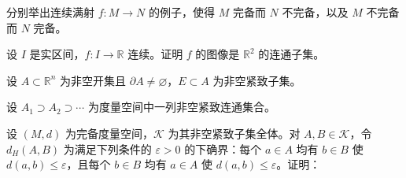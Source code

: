 \noindent\begin{minipage}{\textwidth}
分别举出连续满射 $f:M\to N$ 的例子，使得 $M$ 完备而 $N$ 不完备，以及 $M$ 不完备而 $N$ 完备。
\end{minipage}\par\vfill
\newpage
\noindent\begin{minipage}{\textwidth}
设 $I$ 是实区间，$f:I\to\mathbb R$ 连续。证明 $f$ 的图像是 $\mathbb R^2$ 的连通子集。
\end{minipage}\par\vfill
\noindent\begin{minipage}{\textwidth}
设 $A\subset\mathbb R^n$ 为非空开集且 $\partial A\ne\varnothing$，$E\subset A$ 为非空紧致子集。
\end{minipage}\par\vfill
\noindent\begin{minipage}{\textwidth}
设 $A_1\supset A_2\supset\cdots$ 为度量空间中一列非空紧致连通集合。
\end{minipage}\par\vfill
\noindent\begin{minipage}{\textwidth}
设 $(M,d)$ 为完备度量空间，$\mathcal K$ 为其非空紧致子集全体。对 $A,B\in\mathcal K$，令 $d_H(A,B)$ 为满足下列条件的 $\varepsilon>0$ 的下确界：每个 $a\in A$ 均有 $b\in B$ 使 $d(a,b)\le\varepsilon$，且每个 $b\in B$ 均有 $a\in A$ 使 $d(a,b)\le\varepsilon$。证明：
\end{minipage}\par\vfill
